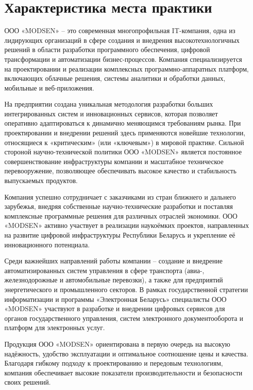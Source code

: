\section{Характеристика места практики}
\label{sec:practice:characteristics}
\newcommand{\company}{\mbox{<<MODSEN>>}}

ООО «MODSEN» – это современная многопрофильная IT-компания, одна из лидирующих организаций в сфере создания и внедрения высокотехнологичных решений в области разработки программного обеспечения, цифровой трансформации и автоматизации бизнес-процессов. Компания специализируется на проектировании и реализации комплексных программно-аппаратных платформ, включающих облачные решения, системы аналитики и обработки данных, мобильные и веб-приложения.

На предприятии создана уникальная методология разработки больших интегрированных систем и инновационных сервисов, которая позволяет оперативно адаптироваться к динамично меняющимся требованиям рынка. При проектировании и внедрении решений здесь применяются новейшие технологии, относящиеся к «критическим» (или «ключевым») в мировой практике. Сильной стороной научно-технической политики ООО «MODSEN» является постоянное совершенствование инфраструктуры компании и масштабное техническое перевооружение, позволяющее обеспечивать высокое качество и стабильность выпускаемых продуктов.

Компания успешно сотрудничает с заказчиками из стран ближнего и дальнего зарубежья, внедряя собственные научно-технические разработки и поставляя комплексные программные решения для различных отраслей экономики. ООО «MODSEN» активно участвует в реализации наукоёмких проектов, направленных на развитие цифровой инфраструктуры Республики Беларусь и укрепление её инновационного потенциала.

Среди важнейших направлений работы компании – создание и внедрение автоматизированных систем управления в сфере транспорта (авиа-, железнодорожные и автомобильные перевозки), а также для предприятий энергетического и промышленного секторов. В рамках государственной стратегии информатизации и программы «Электронная Беларусь» специалисты ООО «MODSEN» участвуют в разработке и внедрении цифровых сервисов для органов государственного управления, систем электронного документооборота и платформ для электронных услуг.

Продукция ООО «MODSEN» ориентирована в первую очередь на высокую надёжность, удобство эксплуатации и оптимальное соотношение цены и качества. Благодаря гибкому подходу к проектированию и передовым технологиям, компания обеспечивает высокие показатели производительности и безопасности своих решений.

